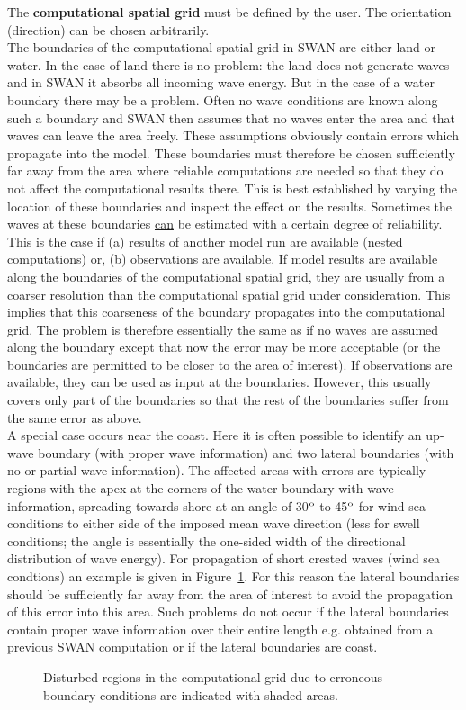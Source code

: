 \documentclass[12pt]{book}
\begin{document}
The {\bf computational spatial grid} must be defined by the user. The orientation (direction) can be chosen
arbitrarily.
\\[2ex]
\noindent
The boundaries of the computational spatial grid in SWAN are either land or water. In the case of land
there is no problem: the land does not generate waves and in SWAN it absorbs all incoming wave energy.
But in the case of a water boundary there may be a problem. Often no wave conditions are known along
such a boundary and SWAN then assumes that no waves enter the area and that waves can leave the
area freely. These assumptions obviously contain errors which propagate into the model. These
boundaries must therefore be chosen sufficiently far away from the area where reliable computations are
needed so that they do not affect the computational results there. This is best established by varying the
location of these boundaries and inspect the effect on the results. Sometimes the waves at these boundaries
\underline{can} be estimated with a certain degree of reliability. This is the case if (a) results of another
model run are available (nested computations) or, (b) observations are available. If model results are
available along the boundaries of the computational spatial grid, they are usually from a coarser
resolution than the computational spatial grid under consideration. This implies that this coarseness of
the boundary propagates into the computational grid. The problem is therefore essentially the same as
if no waves are assumed along the boundary except that now the error may be more acceptable (or the
boundaries are permitted to be closer to the area of interest). If observations are available, they can be
used as input at the boundaries. However, this usually covers only part of the boundaries so that the rest
of the boundaries suffer from the same error as above.
\\[2ex]
\noindent
A special case occurs near the coast. Here it is often possible to identify an up-wave boundary (with
proper wave information) and two lateral boundaries (with no or partial wave information). The affected
areas with errors are typically regions with the apex at the corners of the water boundary with wave
information, spreading towards shore at an angle of 30$^{{\rm o}}$ to 45$^{{\rm o}}$ for wind sea conditions
to either side of the imposed mean wave direction (less for swell conditions; the angle is essentially the
one-sided width of the directional distribution of wave energy). For propagation of short crested waves
(wind sea condtions) an example is given in Figure~\ref{fig:boundreg}. For this reason the lateral boundaries
should be sufficiently far away from the area of interest to avoid the propagation of this error into this area.
Such problems do not occur if the lateral boundaries contain proper wave information over their entire length
e.g. obtained from a previous SWAN computation or if the lateral boundaries are coast.
\begin{figure}[htp]
   \centerline{
              }
   \caption{Disturbed regions in the computational grid due to erroneous boundary conditions are indicated
            with shaded areas.}
   \label{fig:boundreg}
\end{figure}
\end{document}
